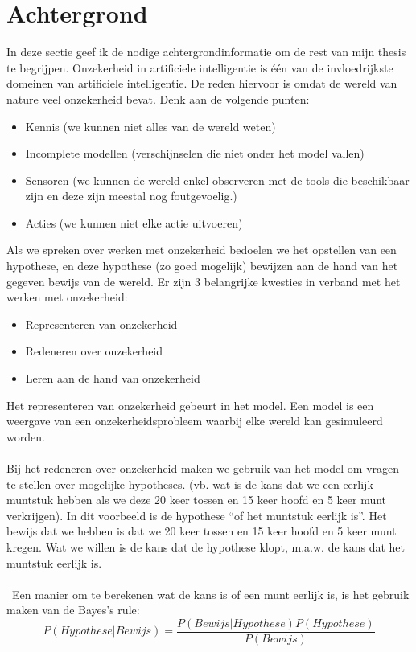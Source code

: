 \documentclass[12pt,a4paper,oneside]{book}
\begin{document}
\chapter{Achtergrond}
In deze sectie geef ik de nodige achtergrondinformatie om de rest van mijn thesis te begrijpen.
Onzekerheid in artificiele intelligentie is één van de invloedrijkste domeinen van artificiele intelligentie. De reden hiervoor is omdat de wereld van nature veel onzekerheid bevat. Denk aan de volgende punten:
\begin{itemize}
	\item Kennis (we kunnen niet alles van de wereld weten)
	\item Incomplete modellen (verschijnselen die niet onder het model vallen)
	\item Sensoren (we kunnen de wereld enkel observeren met de tools die beschikbaar zijn en deze zijn meestal nog foutgevoelig.)
	\item Acties (we kunnen niet elke actie uitvoeren)
\end{itemize}
Als we spreken over werken met onzekerheid bedoelen we het opstellen van een hypothese, en deze hypothese (zo goed mogelijk) bewijzen aan de hand van het gegeven bewijs van de wereld.
Er zijn 3 belangrijke kwesties in verband met het werken met onzekerheid:
\begin{itemize}
	\item Representeren van onzekerheid
	\item Redeneren over onzekerheid
	\item Leren aan de hand van onzekerheid
\end{itemize}
Het representeren van onzekerheid gebeurt in het model. Een model is een weergave van een onzekerheidsprobleem waarbij elke wereld kan gesimuleerd worden.
\\\\
Bij het redeneren over onzekerheid maken we gebruik van het model om vragen te stellen over mogelijke hypotheses. (vb. wat is de kans dat we een eerlijk muntstuk hebben als we deze 20 keer tossen en 15 keer hoofd en 5 keer munt verkrijgen). In dit voorbeeld is de hypothese “of het muntstuk eerlijk is”. Het bewijs dat we hebben is dat we 20 keer tossen en 15 keer hoofd en 5 keer munt kregen. Wat we willen is de kans dat de hypothese klopt, m.a.w. de kans dat het muntstuk eerlijk is.
\\\\\
Een manier om te berekenen wat de kans is of een munt eerlijk is, is het gebruik maken van de Bayes’s rule:
\begin{equation} 
	\label{eq:bayesrule}
	P(Hypothese|Bewijs) = \frac{P(Bewijs|Hypothese)P(Hypothese)}{P(Bewijs)}
\end{equation}
\end{document}
